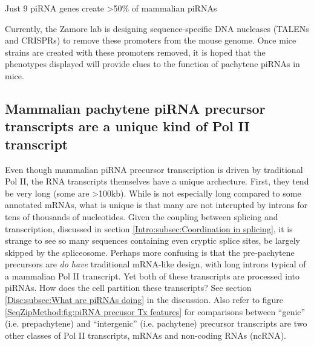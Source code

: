     \begin{table} %
      \caption{Just 9 piRNA genes create >50\% of mammalian piRNAs}
      \label{SeqZipMethod:tab:matchedClusterValues}
      \end{table}
    

    Currently, the Zamore lab is designing sequence-specific DNA nucleases (TALENs and CRISPRs) to remove these promoters from the mouse genome. Once mice strains are created with these promoters removed, it is hoped that the phenotypes displayed will provide clues to the function of pachytene piRNAs in mice.

  \subsection{Mammalian pachytene piRNA precursor transcripts are a unique kind of Pol II transcript}
    \label{SeqZipMethod:subsec:pachytene Tx are different}

    Even though mammalian piRNA precursor transcription is driven by traditional Pol II, the RNA transcripts themselves have a unique archecture. First, they tend be very long (some are >100kb). While is not especially long compared to some annotated mRNAs, what is unique is that many are not interupted by introns for tens of thousands of nucleotides. Given the coupling between splicing and transcription, discussed in section \ref{Intro:subsec:Coordination in splicing}, it is strange to see so many sequences containing even cryptic splice sites, be largely skipped by the spliceosome. Perhaps more confusing is that the pre-pachytene precursors are \textit{do have} traditional mRNA-like design, with long introns typical of a mammalian Pol II transcript. Yet both of these transcripts are processed into piRNAs. How does the cell partition these transcripts? See section \ref{Disc:subsec:What are piRNAs doing} in the discussion. Also refer to figure \ref{SeqZipMethod:fig:piRNA precusor Tx features} for comparisons between ``genic'' (i.e. prepachytene) and ``intergenic'' (i.e. pachytene) precursor transcripts are two other classes of Pol II transcripts, mRNAs and non-coding RNAs (ncRNA).

